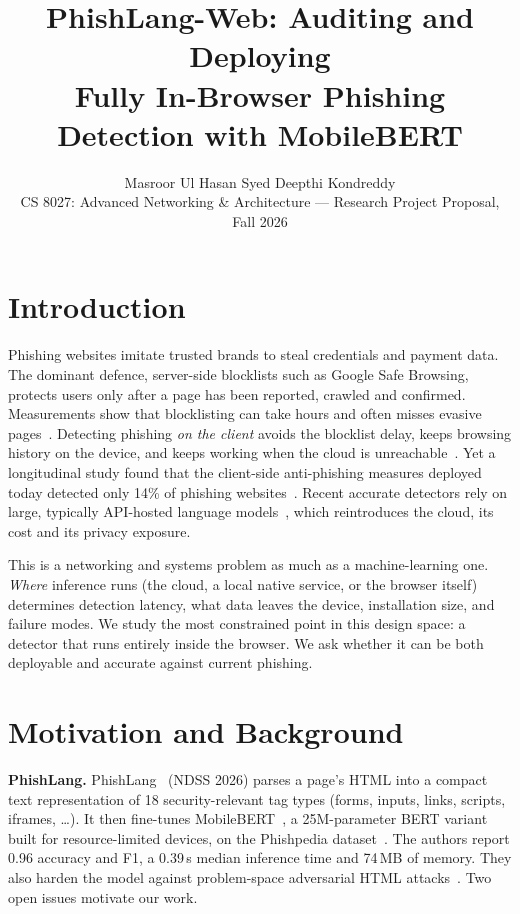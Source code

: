 \documentclass[11pt]{article}
\title{\vspace{-1.8em}\Large\textbf{PhishLang-Web: Auditing and Deploying\\Fully In-Browser Phishing Detection with MobileBERT}}
\author{Masroor Ul Hasan Syed \quad Deepthi Kondreddy\\[2pt]
\small CS 8027: Advanced Networking \& Architecture --- Research Project Proposal, Fall 2026}
\date{\vspace{-2.5em}}
\begin{document}
\maketitle

\section{Introduction}
Phishing websites imitate trusted brands to steal credentials and payment data. The dominant defence, server-side blocklists such as Google Safe Browsing, protects users only after a page has been reported, crawled and confirmed. Measurements show that blocklisting can take hours and often misses evasive pages~\cite{oest2020phishtime,roy2026phishlang}. Detecting phishing \emph{on the client} avoids the blocklist delay, keeps browsing history on the device, and keeps working when the cloud is unreachable~\cite{roy2026phishlang}. Yet a longitudinal study found that the client-side anti-phishing measures deployed today detected only 14\% of phishing websites~\cite{pourmohamad2024clientside}. Recent accurate detectors rely on large, typically API-hosted language models~\cite{koide2024chatphishdetector,li2024knowphish,cao2025phishagent}, which reintroduces the cloud, its cost and its privacy exposure.

This is a networking and systems problem as much as a machine-learning one. \emph{Where} inference runs (the cloud, a local native service, or the browser itself) determines detection latency, what data leaves the device, installation size, and failure modes. We study the most constrained point in this design space: a detector that runs entirely inside the browser. We ask whether it can be both deployable and accurate against current phishing.

\section{Motivation and Background}
\textbf{PhishLang.} PhishLang~\cite{roy2026phishlang} (NDSS 2026) parses a page's HTML into a compact text representation of 18 security-relevant tag types (forms, inputs, links, scripts, iframes, \ldots). It then fine-tunes MobileBERT~\cite{sun2020mobilebert}, a 25M-parameter BERT variant built for resource-limited devices, on the Phishpedia dataset~\cite{lin2021phishpedia}. The authors report 0.96 accuracy and F1, a 0.39\,s median inference time and 74\,MB of memory. They also harden the model against problem-space adversarial HTML attacks~\cite{montaruli2023raze}. Two open issues motivate our work.
\end{document}
